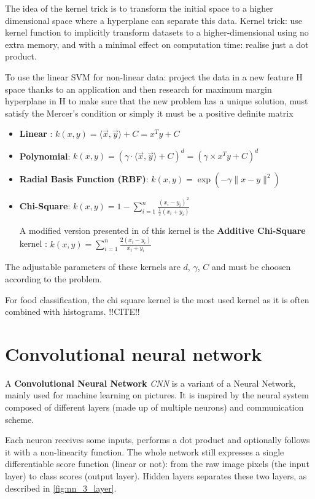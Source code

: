 The idea of the kernel trick is to transform the initial space to a higher dimensional space where a hyperplane can separate this data.
Kernel trick: use kernel function to implicitly transform datasets to a higher-dimensional using no extra memory, and with a minimal effect on computation time: realise just a dot product.

To use the linear SVM for non-linear data: project the data in a new feature H space thanks to an application and then research for maximum margin hyperplane in H
to make sure that the new problem has a unique solution, 
must satisfy the Mercer's condition or simply it must be a positive definite matrix

\begin{itemize}
    \item \textbf{Linear} : $k(x, y) = \langle \vec{x} , \vec{y} \rangle + C = x^T y + C$
    \item \textbf{Polynomial}: $k(x, y) = (\gamma \cdot \langle \vec{x} , \vec{y} \rangle + C)^d = (\gamma \times x^T y + C)^d$
    \item \textbf{Radial Basis Function (RBF)}: $k(x, y) = \exp \left( - \gamma \lVert x - y \rVert ^2 \right)$
    \item \textbf{Chi-Square}: $\displaystyle k(x, y) = 1 - \sum_{i=1}^n \frac{(x_i-y_i)^2}{\frac{1}{2} (x_i+y_i)}$
    
    A modified version presented in \cite{Vedaldi2010} of this kernel is the \textbf{Additive Chi-Square} kernel :
    $\displaystyle k(x, y) = \sum_{i=1}^n \frac{2 (x_i - y_i)}{x_i + y_i} $
\end{itemize}

The adjustable parameters of these kernels are $d$, $\gamma$, $C$ and must be choosen according to the problem.

For food classification, the chi square kernel is the most used kernel as it is often combined with histograms. !!CITE!!

\section{Convolutional neural network}

A \textbf{Convolutional Neural Network} \textit{CNN} is a variant of a Neural Network, mainly used for machine learning on pictures. It is inspired by the neural system composed of different layers (made up of multiple neurons) and communication scheme.

Each neuron receives some inputs, performs a dot product and optionally follows it with a non-linearity function. The whole network still expresses a single differentiable score function (linear or not): from the raw image pixels (the input layer) to class scores (output layer). Hidden layers separates these two layers, as described in \ref{fig:nn_3_layer}.

